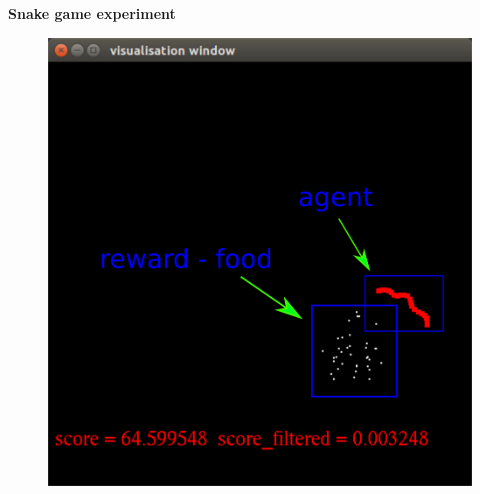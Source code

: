 \documentclass[xcolor=dvipsnames]{beamer}
\begin{document}
\begin{frame}{\bf Snake game experiment}


\begin{figure}[htbp]
  \centering
  \includegraphics[scale=0.15]{../../diagrams/worms_rl_game_desc.png}
\end{figure}


\end{frame}
\end{document}
